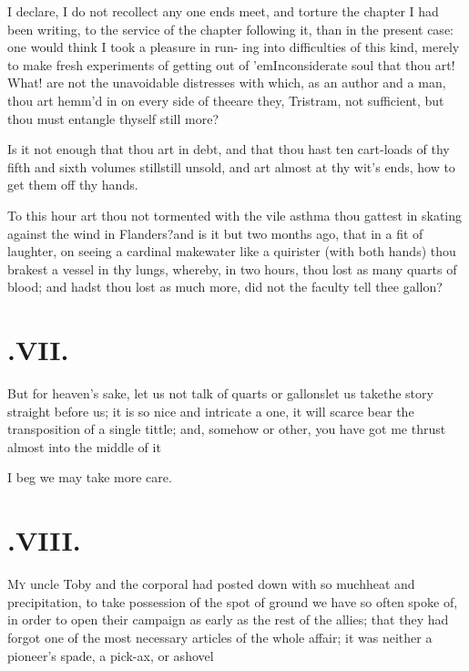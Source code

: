 \documentclass{article}
\begin{document}
I declare, I do not recollect any one\break
{} 
ends meet, and torture the chapter I had been writing, to the
service of the chapter following it, than in the present case:
one would think I took a pleasure in run- ing into
difficulties of this kind, merely to make fresh experiments of
getting out of ’em\tsh Inconsiderate soul that thou art! What!
are not the unavoidable distresses with which, as an author and
a man, thou art hemm’d in on every side of thee\tsh are they,
Tristram, not sufficient, but thou must entangle thyself still
more?


Is it not enough that thou art in debt, and that thou hast ten
cart-loads of thy fifth and sixth volumes still\tsk still
unsold, and art almost at thy wit’s ends, how to get them off
thy hands.


To this hour art thou not tormented with the vile asthma
thou gattest in skating against the wind in Flanders?\break and is
it but two months ago, that in a fit of laughter, on seeing a
cardinal make\break water like a quirister (with both hands) thou brakest
a vessel in thy lungs, where\-by, in two hours, thou lost as many
quarts of blood; and hadst thou lost as much more, did not the
faculty tell thee\break
{}
gallon?\tsh

\section{.\enspace VII.}

\quad\tsk But for heaven’s sake, let us not talk of quarts or
gallons\tsh let us take\break the story straight before us; it
is so nice and intricate a one, it will scarce bear the
transposition of a single tittle; and, somehow or other, you have
got me thrust almost into the middle of it\tsh

\tsh I beg we may take more care.

\vfill{}\eject
\section{.\enspace VIII.}

\lettrine{M}{y} uncle Toby and the corporal
had posted down with so much\break heat and precipitation, to take
possession of the spot of ground we have so often spoke of, in
order to open their campaign as early as the rest of the allies;
that they had forgot one of the most necessary articles of the
whole affair; it was neither a pioneer’s spade, a pick-ax, or
a\break shovel\tsk
\end{document}
